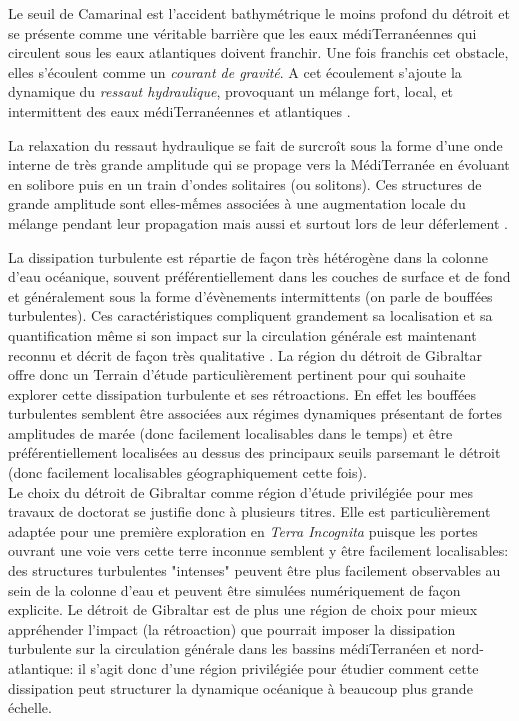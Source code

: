 Le seuil de Camarinal est l'accident bathymétrique le moins profond du détroit et se présente comme une véritable barrière que les eaux médiTerranéennes qui circulent sous les eaux atlantiques doivent franchir. Une fois franchis cet obstacle, elles s'écoulent comme un \textit{courant de gravité}. A cet écoulement s'ajoute la dynamique du \textit{ressaut hydraulique}, provoquant un mélange fort, local, et intermittent des eaux médiTerranéennes et atlantiques \citep{wesson_1994,GarciaLafuente2011}.

La relaxation du ressaut hydraulique se fait de surcroît sous la forme d'une onde interne de très grande amplitude qui se propage vers la MédiTerranée en évoluant \color{green} en solibore puis en un train d'ondes solitaires (ou solitons). Ces structures de grande amplitude sont elles-mếmes associées à une augmentation locale du mélange pendant leur propagation mais aussi et surtout lors de leur déferlement \citep{vlasenko_2009}. \color{red}

\color{blue}
La dissipation turbulente est répartie de façon très hétérogène dans la colonne d'eau océanique, souvent préférentiellement dans les couches de surface et de fond et généralement sous la forme d'évènements intermittents (on parle de bouffées turbulentes). Ces caractéristiques compliquent grandement sa localisation et sa quantification même si son impact sur la circulation générale est maintenant reconnu et décrit de façon très qualitative \cite{de_lavergne_abyssal_2017}. 
La région du détroit de Gibraltar offre donc un Terrain d'étude particulièrement pertinent pour qui souhaite explorer cette dissipation turbulente et ses rétroactions. En effet les bouffées turbulentes semblent être associées aux régimes dynamiques présentant de fortes amplitudes de marée (donc facilement localisables dans le temps) et être préférentiellement localisées au dessus des principaux seuils parsemant le détroit (donc facilement localisables géographiquement cette fois).\\
Le choix du détroit de Gibraltar comme région d'étude privilégiée pour mes travaux de doctorat se justifie donc à plusieurs titres. Elle est particulièrement adaptée pour une première exploration en \textit{Terra Incognita} puisque les portes ouvrant une voie vers cette terre inconnue semblent y être facilement localisables: des structures turbulentes "intenses" peuvent être plus facilement observables au sein de la colonne d'eau et peuvent être simulées numériquement de façon explicite. Le détroit de Gibraltar est de plus une région de choix pour mieux appréhender l'impact (la rétroaction) que pourrait imposer la dissipation turbulente sur la circulation générale dans les bassins médiTerranéen et nord-atlantique: il s'agit donc d'une région privilégiée pour étudier comment cette dissipation peut structurer la dynamique océanique à beaucoup plus grande échelle.
\color{black}

